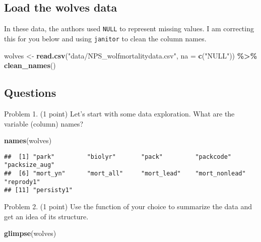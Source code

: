 \documentclass[
]{article}
\newenvironment{Shaded}{\begin{snugshade}}{\end{snugshade}}
\newcommand{\AttributeTok}[1]{\textcolor[rgb]{0.13,0.29,0.53}{#1}}
\newcommand{\FunctionTok}[1]{\textcolor[rgb]{0.13,0.29,0.53}{\textbf{#1}}}
\newcommand{\NormalTok}[1]{#1}
\newcommand{\OtherTok}[1]{\textcolor[rgb]{0.56,0.35,0.01}{#1}}
\newcommand{\SpecialCharTok}[1]{\textcolor[rgb]{0.81,0.36,0.00}{\textbf{#1}}}
\newcommand{\StringTok}[1]{\textcolor[rgb]{0.31,0.60,0.02}{#1}}
\begin{document}
\hypertarget{load-the-wolves-data}{%
\subsection{Load the wolves data}\label{load-the-wolves-data}}

In these data, the authors used \texttt{NULL} to represent missing
values. I am correcting this for you below and using \texttt{janitor} to
clean the column names.

\begin{Shaded}
\begin{Highlighting}[]
\NormalTok{wolves }\OtherTok{\textless{}{-}} \FunctionTok{read.csv}\NormalTok{(}\StringTok{"data/NPS\_wolfmortalitydata.csv"}\NormalTok{, }\AttributeTok{na =} \FunctionTok{c}\NormalTok{(}\StringTok{"NULL"}\NormalTok{)) }\SpecialCharTok{\%\textgreater{}\%} \FunctionTok{clean\_names}\NormalTok{()}
\end{Highlighting}
\end{Shaded}

\hypertarget{questions}{%
\subsection{Questions}\label{questions}}

Problem 1. (1 point) Let's start with some data exploration. What are
the variable (column) names?

\begin{Shaded}
\begin{Highlighting}[]
\FunctionTok{names}\NormalTok{(wolves)}
\end{Highlighting}
\end{Shaded}

\begin{verbatim}
##  [1] "park"         "biolyr"       "pack"         "packcode"     "packsize_aug"
##  [6] "mort_yn"      "mort_all"     "mort_lead"    "mort_nonlead" "reprody1"    
## [11] "persisty1"
\end{verbatim}

Problem 2. (1 point) Use the function of your choice to summarize the
data and get an idea of its structure.

\begin{Shaded}
\begin{Highlighting}[]
\FunctionTok{glimpse}\NormalTok{(wolves)}
\end{Highlighting}
\end{Shaded}
\end{document}
